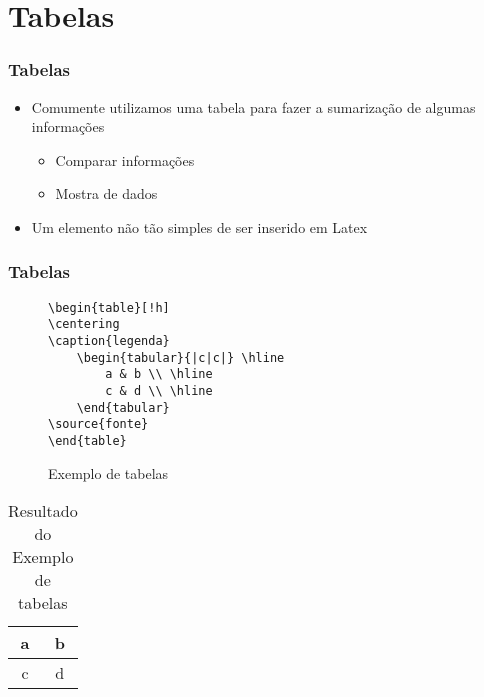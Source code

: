 \section{Tabelas}

\begin{frame}[fragile] \frametitle{Tabelas}
\begin{itemize}
	\item Comumente utilizamos uma tabela para fazer a sumarização de algumas informações
	\begin{itemize}
		\item Comparar informações
		\item Mostra de dados
	\end{itemize}
	\item Um elemento não tão simples de ser inserido em Latex
\end{itemize}
\end{frame}

\begin{frame}[fragile] \frametitle{Tabelas}
\vspace{-0.5cm}
\begin{figure}[!t]
\caption{Exemplo de tabelas}
\begin{lstlisting}
\begin{table}[!h]
\centering
\caption{legenda}
	\begin{tabular}{|c|c|} \hline
		a & b \\ \hline
		c & d \\ \hline
	\end{tabular}
\source{fonte}
\end{table}
\end{lstlisting}
\ownsrc
\end{figure}
\vspace{-0.5cm}
\begin{table}[!h]
\centering
\caption{Resultado do Exemplo de tabelas}
	\begin{tabular}{|c|c|} \hline
		a & b \\ \hline
		c & d \\ \hline
	\end{tabular}
\\ \ownsrc
\end{table}
\end{frame}

